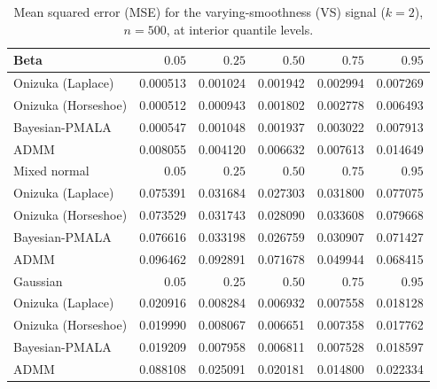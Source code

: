 \begin{table}[!htbp]
\centering
\small
\caption{Mean squared error (MSE) for the varying-smoothness (VS) signal ($k=2$), $n=500$, at interior quantile levels.}
\label{tab:vs_int_mse}
\begin{tabular}{lrrrrr}
\toprule
Beta & $0.05$ & $0.25$ & $0.50$ & $0.75$ & $0.95$ \\
\midrule
Onizuka (Laplace) & 0.000513 & 0.001024 & 0.001942 & 0.002994 & 0.007269 \\
Onizuka (Horseshoe) & 0.000512 & 0.000943 & 0.001802 & 0.002778 & 0.006493 \\
Bayesian-PMALA & 0.000547 & 0.001048 & 0.001937 & 0.003022 & 0.007913 \\
ADMM & 0.008055 & 0.004120 & 0.006632 & 0.007613 & 0.014649 \\
\midrule
Mixed normal & $0.05$ & $0.25$ & $0.50$ & $0.75$ & $0.95$ \\
\midrule
Onizuka (Laplace) & 0.075391 & 0.031684 & 0.027303 & 0.031800 & 0.077075 \\
Onizuka (Horseshoe) & 0.073529 & 0.031743 & 0.028090 & 0.033608 & 0.079668 \\
Bayesian-PMALA & 0.076616 & 0.033198 & 0.026759 & 0.030907 & 0.071427 \\
ADMM & 0.096462 & 0.092891 & 0.071678 & 0.049944 & 0.068415 \\
\midrule
Gaussian & $0.05$ & $0.25$ & $0.50$ & $0.75$ & $0.95$ \\
\midrule
Onizuka (Laplace) & 0.020916 & 0.008284 & 0.006932 & 0.007558 & 0.018128 \\
Onizuka (Horseshoe) & 0.019990 & 0.008067 & 0.006651 & 0.007358 & 0.017762 \\
Bayesian-PMALA & 0.019209 & 0.007958 & 0.006811 & 0.007528 & 0.018597 \\
ADMM & 0.088108 & 0.025091 & 0.020181 & 0.014800 & 0.022334 \\
\bottomrule
\end{tabular}
\end{table}
